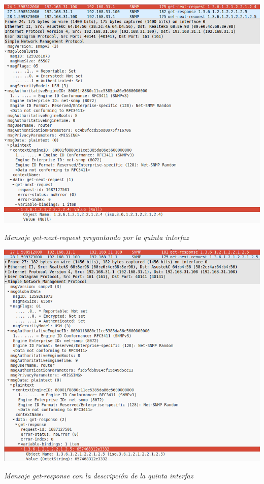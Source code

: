 \documentclass[]{article}
\begin{document}
\begin{center}
	\includegraphics[scale=0.45]{images/snmp/get-next-request.png}
	
	\textit{Mensaje get-next-request preguntando por la quinta interfaz}
\end{center}


\begin{center}
	\includegraphics[scale=0.45]{images/snmp/get-response.png}
	
	\textit{Mensaje get-response con la descripción de la quinta interfaz}
\end{center}
\end{document}
